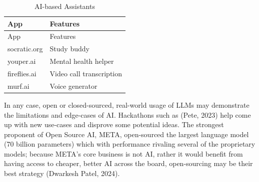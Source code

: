 \documentclass[
  12pt,
  letterpaper,
  DIV=11,
  numbers=noendperiod]{scrartcl}
\begin{document}
\def\pandoctableshortcapt{AI-based Assistants}

\begin{longtable}[]{@{}ll@{}}
\caption[AI-based Assistants]{AI-based Assistants}\tabularnewline
\toprule\noalign{}
App & Features \\
\midrule\noalign{}
\endfirsthead
\toprule\noalign{}
App & Features \\
\midrule\noalign{}
\endhead
\bottomrule\noalign{}
\endlastfoot
socratic.org & Study buddy \\
youper.ai & Mental health helper \\
fireflies.ai & Video call transcription \\
murf.ai & Voice generator \\
\end{longtable}

\let\pandoctableshortcapt\relax

In any case, open or closed-sourced, real-world usage of LLMs may
demonstrate the limitations and edge-cases of AI. Hackathons such as
(Pete, 2023) help come up with new use-cases and disprove some potential
ideas. The strongest proponent of Open Source AI, META, open-sourced the
largest language model (70 billion parameters) which with performance
rivaling several of the proprietary models; because META's core business
is not AI, rather it would benefit from having access to cheaper, better
AI across the board, open-sourcing may be their best strategy (Dwarkesh
Patel, 2024).

\def\pandoctableshortcapt{7 Years of Rapid AI Model Innovation}
\end{document}
